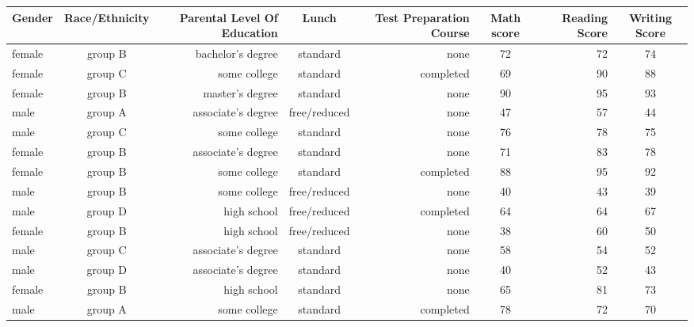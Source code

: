 \documentclass{article}
\begin{document}
\begin{sidewaystable}[h!]
		\begin{tabular}{l|c|r|c|r|c|r|c}
				\textbf{Gender} & \textbf{Race/Ethnicity} &
				\textbf{Parental Level Of Education} & \textbf{Lunch} & \textbf{Test Preparation Course} & \textbf{Math score} & \textbf{Reading Score} & \textbf{Writing Score}\\
				\hline
				female & group B & bachelor's degree & standard & none & 72 & 72 & 74\\
				female & group C & some college & standard & completed & 69 & 90 & 88\\
				female & group B & master's degree & standard & none & 90 & 95 & 93\\
				male & group A & associate's degree & free/reduced & none & 47 & 57 & 44\\
				male & group C & some college & standard & none & 76 & 78 & 75\\
				female & group B & associate's degree & standard & none & 71 & 83 & 78\\
				female & group B & some college & standard & completed & 88 & 95 & 92\\
				male & group B & some college & free/reduced & none & 40 & 43 & 39\\
				male & group D & high school & free/reduced & completed & 64 & 64 & 67\\
				female & group B & high school & free/reduced & none & 38 & 60 & 50\\
				male & group C & associate's degree & standard & none & 58 & 54 & 52\\
				male & group D & associate's degree & standard & none & 40 & 52 & 43\\
				female & group B & high school & standard & none & 65 & 81 & 73\\
				male & group A & some college & standard & completed & 78 & 72 & 70\\
	\end{tabular}
\end{sidewaystable}
\end{document}
